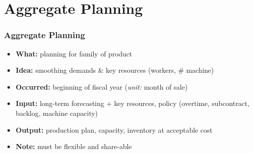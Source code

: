 \documentclass[10pt,handout,notes=show]{beamer}
\begin{document}
\section[Aggre. planning]{Aggregate Planning }

\begin{frame}
  \frametitle{Aggregate Planning}

    \begin{itemize}
      \item \textbf{What:} planning for \alert{family of product}
      \item \textbf{Idea:} smoothing demands \& key resources (workers, \# machine)
      \item \textbf{Occurred:} beginning of fiscal year (\emph{unit:} month of sale)
      \item \textbf{Input:} long-term forecasting + key resources, policy (overtime, subcontract, backlog, machine capacity)
      \item \textbf{Output:} production plan, capacity, inventory at \alert{acceptable cost}
      \item \textbf{Note:} must be flexible and share-able
    \end{itemize}

\end{frame}
\end{document}
